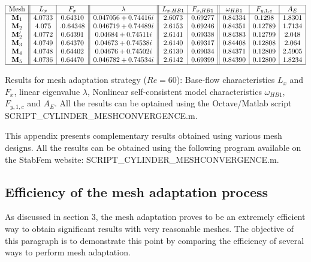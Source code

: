\documentclass[twocolumn,10pt]{asme2ej}
\begin{document}
\begin{table*}
$$
\begin{array}{|c||c|c||c||c|c||c|c|c|}
\hline
\mbox{Mesh} & L_x & F_x & \lambda & L_{x,HB1} & F_{x,HB1} & \omega_{HB1}  & F_{y,1,c} & A_{E} \\
\hline
\mathbf{M}_1 & 4.0733 & 0.64310	& 0.047056 + 0.74416i 		& 2.6073  & 0.69277 	&  0.84334 & 0.1298 & 1.8301  \\
\mathbf{M}_2 & 4.075 &.  0.64348  	& 0.046719 + 0.74489i 		& 2.6153  & 0.69246 	& 0.84351 & 0.12789 & 1.7134 \\ 
\mathbf{M}_2' & 4.0772 & 0.64391 	& 0.04684 +  0.74511i 		& 2.6141  & 0.69338 	& 0.84383 & 0.12799 & 2.048   \\  
\mathbf{M}_3 & 4.0749 & 0.64370 	& 0.04673 + 0.74538i		& 2.6140     & 0.69317	& 0.84408 & 0.12808 & 2.064   \\ 
\mathbf{M}_4 & 4.0748 & 0.64402 	& 0.04676  + 0.74502i 		& 2.6130 	& 0.69034 	& 0.84371 & 0.12809 & 2.5905 \\
\mathbf{M}_5 & 4.0736 & 0.64470	& 0.046782+0.74534i		& 2.6142 	& 0.69399		& 0.84390 & 0.12800 & 1.8234 \\
\hline
\end{array}
$$
\caption{Results for mesh adaptation strategy ($Re = 60$): Base-flow characteristics $L_x$ and $F_x$, linear eigenvalue $\lambda$, 
Nonlinear self-consistent model characteristics  $\omega_{HB1}$, $F_{y,1,c}$ and $A_E$. All the results can be optained using the Octave/Matlab script
{\sf SCRIPT\_CYLINDER\_MESHCONVERGENCE.m}. }
\label{tab:conv2}
\end{table*}



This appendix presents complementary results obtained using various mesh designs. 
All the results can be obtained using the following program available on the StabFem website: 
{\sf SCRIPT\_CYLINDER\_MESHCONVERGENCE.m}.

\subsection{Efficiency of the mesh adaptation process}

As discussed in section 3, the mesh adaptation proves to be an extremely efficient way to obtain significant results 
with very reasonable meshes. The objective of this paragraph is to demonstrate this point by comparing the efficiency of several ways to perform mesh adaptation. 
\end{document}
